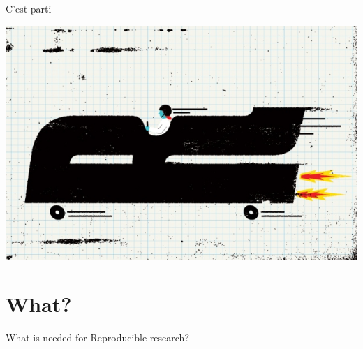 \documentclass[10pt]{beamer}\usepackage[]{graphicx}\usepackage[]{color}
\begin{document}
\begin{frame}{C'est parti}
\begin{center}
\includegraphics[scale=0.51]{introR.jpg}
\end{center}
\end{frame}

\section{What?}


\begin{frame}{What is needed for Reproducible research?}
\def\firstcircle{(0,0) circle (1.5cm)}
\def\secondcircle{(45:2cm) circle (1.5cm)}
\def\thirdcircle{(0:2cm) circle (1.5cm)}
\begin{center}
\end{center}
\end{frame}
\end{document}
